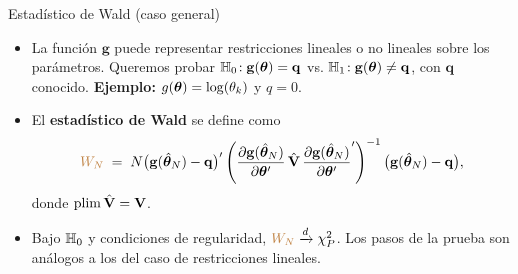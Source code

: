 \documentclass[10pt, xcolor=dvipsnames]{beamer}
\begin{document}
\begin{frame}{Estadístico de Wald (caso general)}
\begin{itemize}
    \item La función \(\mathbf{g}\) puede representar restricciones lineales o no lineales sobre los parámetros. Queremos probar \(\mathbb{H}_{0}\!: \mathbf{g}(\boldsymbol{\theta}) = \mathbf{q}\) vs. \(\mathbb{H}_{1}\!: \mathbf{g}(\boldsymbol{\theta}) \neq \mathbf{q}\), con \(\mathbf{q}\) conocido. \textbf{Ejemplo:} \(g(\boldsymbol{\theta}) = \log(\theta_k)\) y \(q = 0\).

    \medskip
    \item El \textbf{estadístico de Wald} se define como
    \[
        \textcolor{brown}{W_N} \;=\; 
        N\big(\mathbf{g}(\hat{\boldsymbol{\theta}}_N) - \mathbf{q}\big)' 
        \left(
            \frac{\partial \mathbf{g}(\hat{\boldsymbol{\theta}}_N)}{\partial \boldsymbol{\theta}'} 
            \,\hat{\mathbf{V}}\,
            \frac{\partial \mathbf{g}(\hat{\boldsymbol{\theta}}_N)}{\partial \boldsymbol{\theta}'}'
        \right)^{-1}
        \big(\mathbf{g}(\hat{\boldsymbol{\theta}}_N) - \mathbf{q}\big),
    \]
    donde \(\plim \hat{\mathbf{V}} = \mathbf{V}\).
    \medskip
    \item Bajo \(\mathbb{H}_{0}\) y condiciones de regularidad, \(\textcolor{brown}{W_N} \xrightarrow{d} \chi^2_P\). Los pasos de la prueba son análogos a los del caso de restricciones lineales.
\end{itemize}

\hyperlink{PruebaWald}{{}}
\end{frame}



\end{document}
